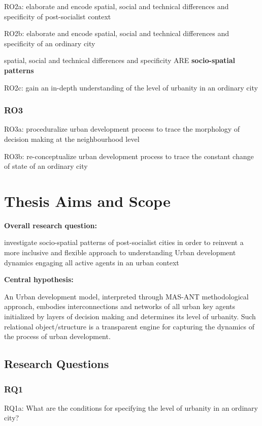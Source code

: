 \documentclass[11pt]{report}
\begin{document}
RO2a: elaborate and encode spatial, social and technical differences and specificity of post-socialist context

RO2b: elaborate and encode spatial, social and technical differences and specificity of an ordinary city

spatial, social and technical differences and specificity ARE \textbf{socio-spatial patterns}

RO2c: gain an in-depth understanding of the level of urbanity in an ordinary city

\subsubsection{RO3}

RO3a: proceduralize urban development process to trace the morphology of decision making at the neighbourhood level

RO3b: re-conceptualize urban development process
to trace the constant change of state of an ordinary city

\section{Thesis Aims and Scope}

\textbf{Overall research question:}

investigate socio-spatial patterns of  post-socialist cities in order to reinvent a more inclusive and flexible approach to understanding Urban development dynamics engaging all active agents in an urban context 

\textbf{Central hypothesis:}

An Urban development model, interpreted through MAS-ANT methodological approach, embodies interconnections and networks of all urban key agents initialized by layers of decision making and determines its level of urbanity.
Such relational object/structure is a transparent engine for capturing the dynamics of the process of urban development. 

\subsection{Research Questions}

\subsubsection{RQ1}

RQ1a: What are the conditions for specifying the level of urbanity in an ordinary city?
\end{document}
